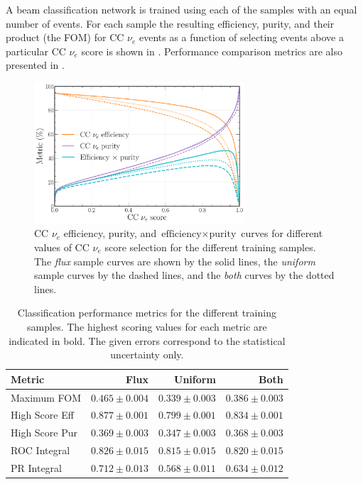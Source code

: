 A beam classification network is trained using each of the samples with an equal number of events.
For each sample the resulting efficiency, purity, and their product (the FOM) for CC $\nu_{e}$
events as a function of selecting events above a particular CC $\nu_{e}$ score is shown in
. Performance comparison metrics are also presented in
.

\begin{figure} %
    \includegraphics[width=0.7\textwidth]{diagrams/7-results/sample_nuel_eff_curves.pdf}
    \caption[CC $\nu_{e}$ efficiency and purity curves for different training samples]
    {CC $\nu_{e}$ efficiency, purity, and $\text{efficiency}\times\text{purity}$ curves for
        different values of CC $\nu_{e}$ score selection for the different training samples. The
        \emph{flux} sample curves are shown by the solid lines, the \emph{uniform} sample curves
        by the dashed lines, and the \emph{both} curves by the dotted lines.}
    \label{fig:sample_nuel_eff_curves}
\end{figure}

\begin{table} %
    \begin{tabular}{lrrr}
        Metric         & Flux           & Uniform & Both  \\
        \midrule
        Maximum FOM    & \textbf{$0.465\pm0.004$} & $0.339\pm0.003$ & $0.386\pm0.003$ \\
        High Score Eff & \textbf{$0.877\pm0.001$} & $0.799\pm0.001$ & $0.834\pm0.001$ \\
        High Score Pur & \textbf{$0.369\pm0.003$} & $0.347\pm0.003$ & $0.368\pm0.003$ \\
        ROC Integral   & \textbf{$0.826\pm0.015$} & $0.815\pm0.015$ & $0.820\pm0.015$ \\
        PR Integral    & \textbf{$0.712\pm0.013$} & $0.568\pm0.011$ & $0.634\pm0.012$ \\
    \end{tabular}
    \caption[Classification performance metrics for different training samples]
    {Classification performance metrics for the different training samples. The highest scoring
        values for each metric are indicated in bold. The given errors correspond to the
        statistical uncertainty only.}
    \label{tab:sample}
\end{table}

